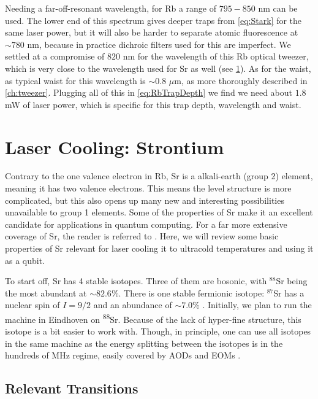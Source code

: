 Needing a far-off-resonant wavelength, for Rb a range of $795 - 850$ nm can be used.
The lower end of this spectrum gives deeper traps from \cref{eq:Stark} for the same laser power, but it will also be harder to separate atomic fluorescence at $\sim 780$ nm, because in practice dichroic filters used for this are imperfect.
We settled at a compromise of $820$ nm for the wavelength of this Rb optical tweezer, which is very close to the wavelength used for Sr as well (see \cref{sec:Sr}). As for the waist, as typical waist for this wavelength is $\sim 0.8$ $\mu$m, as more thoroughly described in \cref{ch:tweezer}. Plugging all of this in \cref{eq:RbTrapDepth} we find we need about $1.8$ mW of laser power, which is specific for this trap depth, wavelength and waist.


\section{Laser Cooling: Strontium}\label{sec:Sr}

Contrary to the one valence electron in \ac{Rb}, \ac{Sr} is a alkali-earth (group 2) element, meaning it has two valence electrons.
This means the level structure is more complicated, but this also opens up many new and interesting possibilities unavailable to group 1 elements.
Some of the properties of Sr make it an excellent candidate for applications in quantum computing.
For a far more extensive coverage of Sr, the reader is referred to \cite{Stellmer2013}. 
Here, we will review some basic properties of Sr relevant for laser cooling it to ultracold temperatures and using it as a qubit.

To start off, Sr has 4 stable isotopes.
Three of them are bosonic, with ${}^{88}$Sr being the most abundant at $\sim82.6\%$. There is one stable fermionic isotope: ${}^{87}$Sr has a nuclear spin of $I=9/2$ and an abundance of $\sim7.0\%$ \cite{Coursey1999}.
Initially, we plan to run the machine in Eindhoven on \textsuperscript{88}Sr. 
Because of the lack of hyper-fine structure, this isotope is a bit easier to work with.
Though, in principle, one can use all isotopes in the same machine as the energy splitting between the isotopes is in the hundreds of MHz regime, easily covered by AODs and EOMs \cite{Stellmer2013}.

\subsection{Relevant Transitions}

